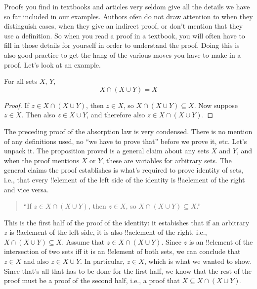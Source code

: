 \documentclass[../../../include/open-logic-section]{subfiles}
\begin{document}

Proofs you find in textbooks and articles very seldom give all the
details we have so far included in our examples. Authors ofen do not
draw attention to when they distinguish cases, when they give an
indirect proof, or don't mention that they use a definition.  So when
you read a proof in a textbook, you will often have to fill in those
details for yourself in order to understand the proof. Doing this is
also good practice to get the hang of the various moves you have to
make in a proof. Let's look at an example.

\begin{prop}[Absorption]
For all sets $X$, $Y$,
\[
X \cap (X \cup Y) = X
\]
\end{prop}

\begin{proof}
If $z \in X \cap (X \cup Y)$, then $z \in X$, so $X \cap (X \cup Y)
\subseteq X$. Now suppose $z \in X$. Then also $z \in X \cup Y$, and
therefore also $z \in X \cap (X \cup Y)$.
\end{proof}

The preceding proof of the absorption law is very condensed. There is
no mention of any definitions used, no ``we have to prove that''
before we prove it, etc. Let's unpack it.  The proposition proved is a
general claim about any sets $X$ and $Y$, and when the proof mentions
$X$ or $Y$, these are variables for arbitrary sets.  The general
claims the proof establishes is what's required to prove identity of
sets, i.e., that every !!{element} of the left side of the identity is
!!a{element} of the right and vice versa.  

\begin{quote}
``If $z \in X \cap (X \cup Y)$, then $z \in X$, so $X \cap (X \cup Y)
  \subseteq X$.''
\end{quote}

This is the first half of the proof of the identity: it estabishes
that if an arbitrary~$z$ is !!a{element} of the left side, it is also
!!a{element} of the right, i.e., $X \cap (X \cup Y) \subseteq X$.
Assume that $z \in X \cap (X \cup Y)$. Since $z$ is an !!{element} of
the intersection of two sets iff it is an !!{element} of both sets, we
can conclude that $z \in X$ and also $z \in X \cup Y$. In particular,
$z \in X$, which is what we wanted to show.  Since that's all that has
to be done for the first half, we know that the rest of the proof must
be a proof of the second half, i.e., a proof that $X \subseteq X \cap
(X \cup Y)$.
\end{document}
